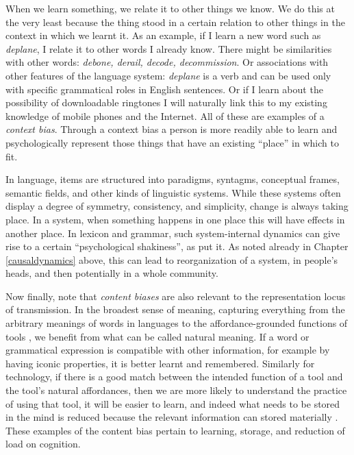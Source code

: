 When we learn something, we relate it to other things we know. We do this at the 
very least because the thing stood in a certain relation to other things in the context 
in which we learnt it. As an example, if I learn a new word such as 
\textit{deplane}, I relate it to other words I already know. There might be similarities with other words: \textit{debone, derail, decode, decommission}. Or associations with other features of the language system: \textit{deplane} is a verb and 
can be used only with specific grammatical roles in English sentences. 
Or if I learn about the possibility of downloadable ringtones I will 
naturally link this to my existing knowledge of mobile 
phones and the Internet. All of these are examples of a \textit{context bias}. Through a context bias  a person is more readily able 
to learn and psychologically represent those things that have an 
existing ``place'' in which to fit. 



In language, items are structured into paradigms, syntagms, conceptual frames, semantic fields, and other kinds of linguistic systems. While these systems often display a degree of symmetry, 
consistency, and simplicity, change is always taking place. In a system, when something happens in one place 
this will have effects in another place. In lexicon and grammar, such system-internal 
dynamics can give rise to a certain ``psychological 
shakiness'', as \citet{sapir_language:_1921} put it. As noted already in Chapter \ref{causaldynamics} above, this can lead to reorganization of 
a system, in people's heads, and then potentially in a whole community.



Now finally, note that \textit{content biases}  are also relevant to the representation locus of transmission. In the broadest sense of meaning, capturing everything from the 
arbitrary meanings of words in languages to the affordance-grounded 
functions of tools \citep{kockelman_residence_2006}, we benefit from what can be called 
natural meaning. If a word or grammatical expression is compatible with 
other information, for example by having iconic properties, it is better 
learnt and remembered. Similarly for technology, if there is a good match between the intended function of a tool and the tool's natural affordances, then we are more likely to understand the practice of using that tool, it 
will be easier to learn, and indeed what needs to be stored 
in the mind is reduced because the relevant information can 
stored materially \citep{norman_cognitive_1991}. These examples of the content bias pertain to learning, storage, and 
reduction of load on cognition. 


